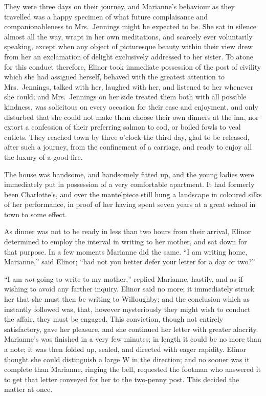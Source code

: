 They were three days on their journey, and Marianne's
behaviour as they travelled was a happy specimen of what
future complaisance and companionableness to Mrs.\ Jennings
might be expected to be.  She sat in silence almost all
the way, wrapt in her own meditations, and scarcely ever
voluntarily speaking, except when any object of picturesque
beauty within their view drew from her an exclamation
of delight exclusively addressed to her sister.  To atone
for this conduct therefore, Elinor took immediate possession
of the post of civility which she had assigned herself,
behaved with the greatest attention to Mrs.\ Jennings,
talked with her, laughed with her, and listened to her
whenever she could; and Mrs.\ Jennings on her side
treated them both with all possible kindness, was solicitous
on every occasion for their ease and enjoyment, and only
disturbed that she could not make them choose their own
dinners at the inn, nor extort a confession of their
preferring salmon to cod, or boiled fowls to veal cutlets.
They reached town by three o'clock the third day, glad to
be released, after such a journey, from the confinement
of a carriage, and ready to enjoy all the luxury of a good fire.

The house was handsome, and handsomely fitted up,
and the young ladies were immediately put in possession
of a very comfortable apartment.  It had formerly
been Charlotte's, and over the mantelpiece still hung
a landscape in coloured silks of her performance,
in proof of her having spent seven years at a great school
in town to some effect.

As dinner was not to be ready in less than two
hours from their arrival, Elinor determined to employ
the interval in writing to her mother, and sat down for
that purpose.  In a few moments Marianne did the same.
``I am writing home, Marianne,'' said Elinor; ``had not you
better defer your letter for a day or two?''

``I am \emph{not} going to write to my mother,''
replied Marianne, hastily, and as if wishing to avoid
any farther inquiry.  Elinor said no more; it immediately
struck her that she must then be writing to Willoughby;
and the conclusion which as instantly followed was,
that, however mysteriously they might wish to conduct
the affair, they must be engaged.  This conviction,
though not entirely satisfactory, gave her pleasure,
and she continued her letter with greater alacrity.
Marianne's was finished in a very few minutes;
in length it could be no more than a note; it was then
folded up, sealed, and directed with eager rapidity.
Elinor thought she could distinguish a large W in
the direction; and no sooner was it complete than Marianne,
ringing the bell, requested the footman who answered it
to get that letter conveyed for her to the two-penny post.
This decided the matter at once.

